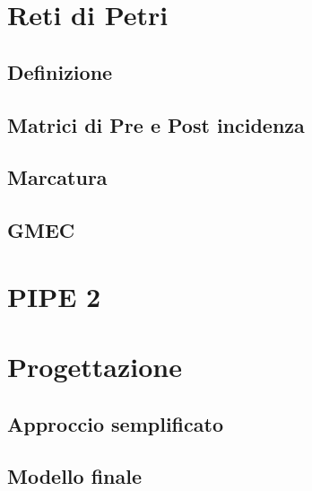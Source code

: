 \chapter{Reti di Petri}
\label{cap:cap1}
\lhead{\textbf{\rightmark}}

\newpage

\section{Definizione}
\label{sec:1.1}

\newpage

\section{Matrici di Pre e Post incidenza}
\label{sec:1.2}

\newpage

\section{Marcatura}
\label{sec:1.3}

\newpage

\section{GMEC}
\label{sec:1.4}

\newpage


\chapter{PIPE 2}
\label{cap:cap2}
\lhead{\textbf{\rightmark}}

\newpage


\chapter{Progettazione}
\label{cap:cap3}
\lhead{\textbf{\rightmark}}

\newpage

\section{Approccio semplificato}
\label{sec:3.1}

\newpage

\section{Modello finale}
\label{sec:3.2}

\newpage


